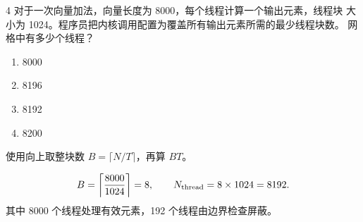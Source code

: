 \begin{solutionexercise}{4}
\problemheading 对于一次向量加法，向量长度为 8000，每个线程计算一个输出元素，线程块
大小为 1024。程序员把内核调用配置为覆盖所有输出元素所需的最少线程块数。
网格中有多少个线程？
\begin{enumerate}[label=\alph*.,leftmargin=2.2em]
  \item 8000
  \item 8196
  \item 8192
  \item 8200
\end{enumerate}

\approachheading 使用向上取整块数 $B=\lceil N/T\rceil$，再算 $BT$。

\answerheading
\[
 B=\left\lceil\frac{8000}{1024}\right\rceil=8,\qquad
 N_{\rm thread}=8\times1024=8192.
\]
其中 8000 个线程处理有效元素，192 个线程由边界检查屏蔽。


\end{solutionexercise}

